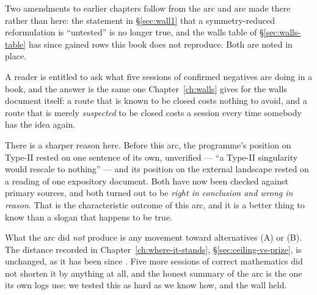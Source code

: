 Two amendments to earlier chapters follow from the arc and are made there rather
than here: the statement in \S\ref{sec:wall1} that a symmetry-reduced
reformulation is ``untested'' is no longer true, and the walls table of
\S\ref{sec:walls-table} has since gained rows this book does not reproduce.
Both are noted in place.

\begin{obsv}
\label{obs:pt-why}
A reader is entitled to ask what five sessions of confirmed negatives are doing
in a book, and the answer is the same one Chapter~\ref{ch:walls} gives for the
walls document itself: a route that is known to be closed costs nothing to
avoid, and a route that is merely \emph{suspected} to be closed costs a session
every time somebody has the idea again.

\smallskip
There is a sharper reason here. Before this arc, the programme's position on
Type-II rested on one sentence of its own, unverified --- ``a Type-II
singularity would rescale to nothing'' --- and its position on the external
landscape rested on a reading of one expository document. Both have now been
checked against primary sources, and both turned out to be \emph{right in
conclusion and wrong in reason}. That is the characteristic outcome of this
arc, and it is a better thing to know than a slogan that happens to be true.

\smallskip
What the arc did \emph{not} produce is any movement toward alternatives (A) or
(B). The distance recorded in Chapter~\ref{ch:where-it-stands},
\S\ref{sec:ceiling-vs-prize}, is unchanged, as it has been since . Five
more sessions of correct mathematics did not shorten it by anything at all, and
the honest summary of the arc is the one its own logs use: we tested this as
hard as we know how, and the wall held.
\end{obsv}
